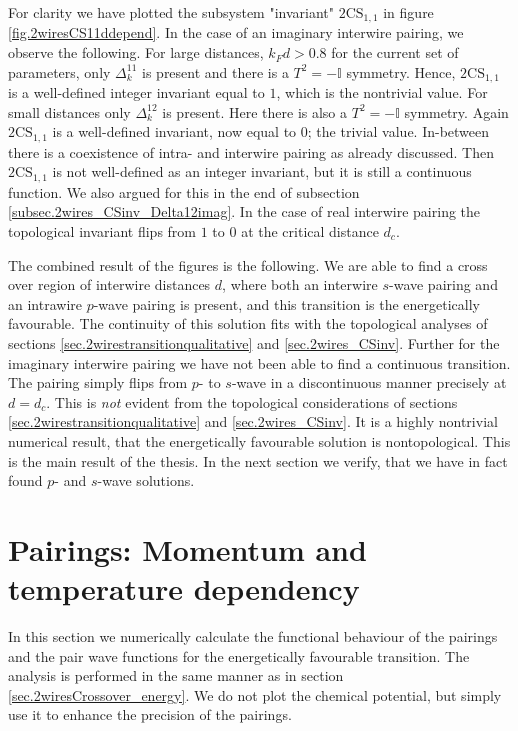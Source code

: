 For clarity we have plotted the subsystem "invariant" $2\text{CS}_{1,1}$ in figure \ref{fig.2wiresCS11ddepend}. In the case of an imaginary interwire pairing, we observe the following. For large distances, $k_Fd > 0.8$ for the current set of parameters, only $\Delta^{11}_k$ is present and there is a $T^2 = -\mathbb{I}$ symmetry. Hence, $2\text{CS}_{1,1}$ is a well-defined integer invariant equal to $1$, which is the nontrivial value. For small distances only $\Delta^{12}_k$ is present. Here there is also a $T^2 = -\mathbb{I}$ symmetry. Again $2\text{CS}_{1,1}$ is a well-defined invariant, now equal to $0$; the trivial value. In-between there is a coexistence of intra- and interwire pairing as already discussed. Then $2\text{CS}_{1,1}$ is not well-defined as an integer invariant, but it is still a continuous function. We also argued for this in the end of subsection \ref{subsec.2wires_CSinv_Delta12imag}. In the case of real interwire pairing the topological invariant flips from $1$ to $0$ at the critical distance $d_c$. 

The combined result of the figures is the following. We are able to find a cross over region of interwire distances $d$, where both an interwire $s$-wave pairing and an intrawire $p$-wave pairing is present, and this transition is the energetically favourable. The continuity of this solution fits with the topological analyses of sections \ref{sec.2wirestransitionqualitative} and \ref{sec.2wires_CSinv}. Further for the imaginary interwire pairing we have not been able to find a continuous transition. The pairing simply flips from $p$- to $s$-wave in a discontinuous manner precisely at $d = d_c$. This is \textit{not} evident from the topological considerations of sections \ref{sec.2wirestransitionqualitative} and \ref{sec.2wires_CSinv}. It is a highly nontrivial numerical result, that the energetically favourable solution is nontopological. This is the main result of the thesis. In the next section we verify, that we have in fact found $p$- and $s$-wave solutions. 


\section{Pairings: Momentum and temperature dependency} \label{sec.pairingsfunctionalbehaviour}
In this section we numerically calculate the functional behaviour of the pairings and the pair wave functions for the energetically favourable transition. The analysis is performed in the same manner as in section \ref{sec.2wiresCrossover_energy}. We do not plot the chemical potential, but simply use it to enhance the precision of the pairings.  

